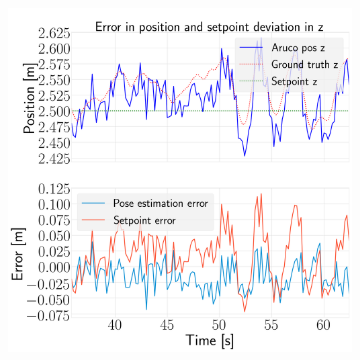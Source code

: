 \documentclass[../Head/report.tex]{subfiles}
\begin{document}
\begin{figure}[H]
\begin{subfigure}[t]{.30\textwidth}
        \caption{}
        \label{fig:hold_pose_estimation_test2_y}
    \end{subfigure}
     \hspace{0.2em}
    \begin{subfigure}[t]{.30\textwidth}
        \centering
        \includegraphics[width=\textwidth]{../Figures/hold_pose_using_aruco_pose_estimation/test2_gps2visionBoard_1.0Wind_-1.0y/error_z/pose_error_z_test1.png}
        \caption{}
        \label{fig:hold_pose_estimation_test2_z}
    \end{subfigure}
    \caption{}
    \label{fig:hold_pose_estimation_test2_error_pos}
\end{figure}
\end{document}
